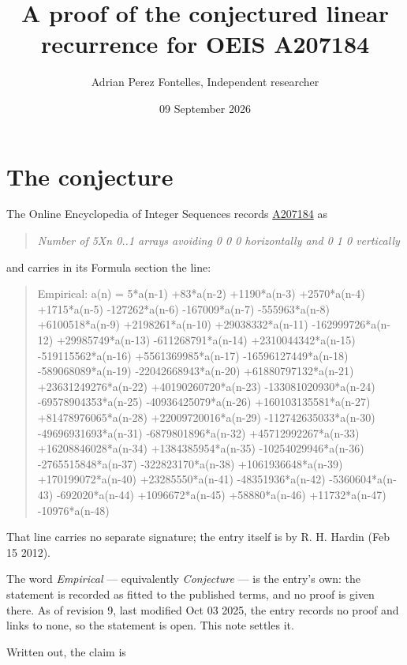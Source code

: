 \documentclass[11pt]{article}
\title{A proof of the conjectured linear recurrence for OEIS A207184}
\author{Adrian Perez Fontelles, Independent researcher}
\date{09 September 2026}
\theoremstyle{definition}
\begin{document}
\maketitle
\section{The conjecture}

The Online Encyclopedia of Integer Sequences records \href{https://oeis.org/A207184}{A207184} as

\begin{quote}\itshape Number of 5Xn 0..1 arrays avoiding 0 0 0 horizontally and 0 1 0 vertically\end{quote}

and carries in its Formula section the line:

\begin{quote}\ttfamily Empirical: a(n) = 5*a(n-1) +83*a(n-2) +1190*a(n-3) +2570*a(n-4) +1715*a(n-5) -127262*a(n-6) -167009*a(n-7) -555963*a(n-8) +6100518*a(n-9) +2198261*a(n-10) +29038332*a(n-11) -162999726*a(n-12) +29985749*a(n-13) -611268791*a(n-14) +2310044342*a(n-15) -519115562*a(n-16) +5561369985*a(n-17) -16596127449*a(n-18) -589068089*a(n-19) -22042668943*a(n-20) +61880797132*a(n-21) +23631249276*a(n-22) +40190260720*a(n-23) -133081020930*a(n-24) -69578904353*a(n-25) -40936425079*a(n-26) +160103135581*a(n-27) +81478976065*a(n-28) +22009720016*a(n-29) -112742635033*a(n-30) -49696931693*a(n-31) -6879801896*a(n-32) +45712992267*a(n-33) +16208846028*a(n-34) +1384385954*a(n-35) -10254029946*a(n-36) -2765515848*a(n-37) -322823170*a(n-38) +1061936648*a(n-39) +170199072*a(n-40) +23285550*a(n-41) -48351936*a(n-42) -5360604*a(n-43) -692020*a(n-44) +1096672*a(n-45) +58880*a(n-46) +11732*a(n-47) -10976*a(n-48)\end{quote}

That line carries no separate signature; the entry itself is by R. H. Hardin (Feb 15 2012).

The word {\itshape Empirical} --- equivalently {\itshape Conjecture} --- is the entry's own: the statement is recorded as fitted to the published terms, and no proof is given there. As of revision 9, last modified Oct 03 2025, the entry records no proof and links to none, so the statement is open. This note settles it.

Written out, the claim is
\end{document}
